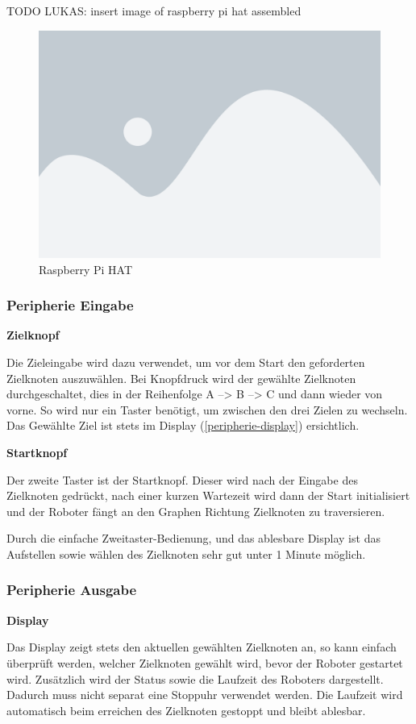 TODO LUKAS: insert image of raspberry pi hat assembled
\begin{figure}[H]
    \centering
    \includegraphics[width=0.5\linewidth]{assets/placeholder.png}
    \caption{Raspberry Pi HAT}
    \label{fig:raspiheader-assembly}
\end{figure}

\subsubsection{Peripherie Eingabe}
\label{zieleingabe}

\textbf{Zielknopf}

Die Zieleingabe wird dazu verwendet, um vor dem Start den geforderten Zielknoten auszuwählen. Bei Knopfdruck wird der gewählte Zielknoten durchgeschaltet, dies in der Reihenfolge A --> B --> C und dann wieder von vorne. So wird nur ein Taster benötigt, um zwischen den drei Zielen zu wechseln. Das Gewählte Ziel ist stets im Display (\ref{peripherie-display}) ersichtlich.

\textbf{Startknopf}

Der zweite Taster ist der Startknopf. Dieser wird nach der Eingabe des Zielknoten gedrückt, nach einer kurzen Wartezeit wird dann der Start initialisiert und der Roboter fängt an den Graphen Richtung Zielknoten zu traversieren.

Durch die einfache Zweitaster-Bedienung, und das ablesbare Display ist das Aufstellen sowie wählen des Zielknoten sehr gut unter 1 Minute möglich. 

\subsubsection{Peripherie Ausgabe}

\textbf{Display}\label{peripherie-display}

Das Display zeigt stets den aktuellen gewählten Zielknoten an, so kann einfach überprüft werden, welcher Zielknoten gewählt wird, bevor der Roboter gestartet wird. 
Zusätzlich wird der Status sowie die Laufzeit des Roboters dargestellt. Dadurch muss nicht separat eine Stoppuhr verwendet werden. Die Laufzeit wird automatisch beim erreichen des Zielknoten gestoppt und bleibt ablesbar.


